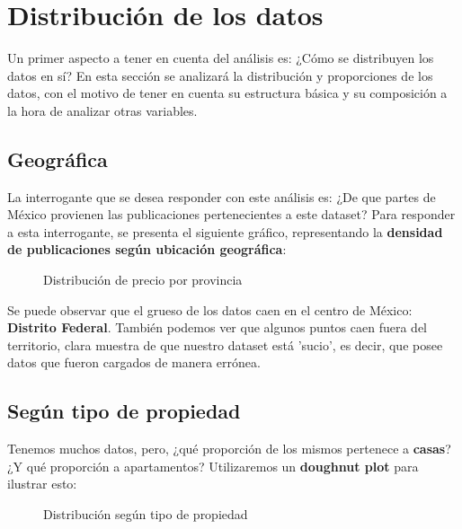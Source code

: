 \documentclass[
10pt, %
a4paper, %
oneside, %
headinclude,footinclude, %
BCOR5mm, %
]{scrartcl}
\begin{document}
\newpage
\section{Distribución de los datos}
    Un primer aspecto a tener en cuenta del análisis es: ¿C\'omo se distribuyen los datos en sí? 
    En esta sección se analizará la distribución y proporciones de los datos, con el motivo de tener en cuenta su estructura b\'asica y su composici\'on a la hora de analizar otras variables.
    
    \subsection{Geográfica}
    La interrogante que se desea responder con este análisis es: ¿De que partes de México provienen las publicaciones pertenecientes a este dataset? Para responder a esta interrogante, se presenta el siguiente gráfico, representando la \textbf{densidad de publicaciones según ubicación geográfica}:
    
    \begin{figure}[H]
        \caption{Distribuci\'on de precio por provincia}
        \label{fig:distribucion-geografica}
    \end{figure}
    
    Se puede observar que el grueso de los datos caen en el centro de M\'exico: \textbf{Distrito Federal}. Tambi\'en podemos ver que algunos puntos caen fuera del territorio, clara muestra de que nuestro dataset est\'a 'sucio', es decir, que posee datos que fueron cargados de manera errónea.
    
    \subsection{Seg\'un tipo de propiedad}
    Tenemos muchos datos, pero, ¿qu\'e proporci\'on de los mismos pertenece a \textbf{casas}? ¿Y qu\'e proporci\'on a apartamentos? Utilizaremos un \textbf{doughnut plot} para ilustrar esto:
    
    \begin{figure}[H]
            \caption{Distribuci\'on seg\'un tipo de propiedad}
            \label{fig:distribucion-tipopropiedad}
    \end{figure}
    
\end{document}

